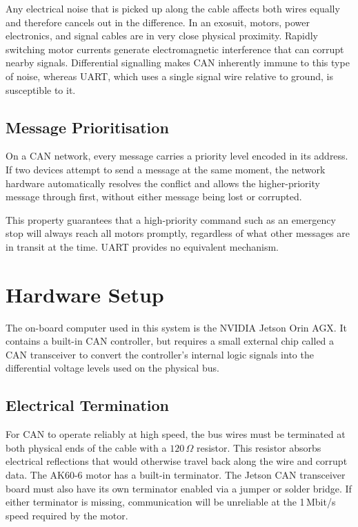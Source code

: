 \documentclass[12pt,a4paper]{article}
\begin{document}
Any electrical noise that is picked up along the cable affects both wires
equally and therefore cancels out in the difference. In an exosuit, motors,
power electronics, and signal cables are in very close physical proximity.
Rapidly switching motor currents generate electromagnetic interference that
can corrupt nearby signals. Differential signalling makes CAN inherently
immune to this type of noise, whereas UART, which uses a single signal wire
relative to ground, is susceptible to it.

\subsection{Message Prioritisation}

On a CAN network, every message carries a priority level encoded in its
address. If two devices attempt to send a message at the same moment, the
network hardware automatically resolves the conflict and allows the
higher-priority message through first, without either message being lost
or corrupted.

This property guarantees that a high-priority command such as an emergency
stop will always reach all motors promptly, regardless of what other
messages are in transit at the time. UART provides no equivalent
mechanism.

\section{Hardware Setup}
\label{sec:hardware}

The on-board computer used in this system is the NVIDIA Jetson Orin AGX.
It contains a built-in CAN controller, but requires a small external chip
called a CAN transceiver to convert the controller's internal logic signals
into the differential voltage levels used on the physical bus.

\subsection{Electrical Termination}

For CAN to operate reliably at high speed, the bus wires must be terminated
at both physical ends of the cable with a $120\,\Omega$ resistor. This
resistor absorbs electrical reflections that would otherwise travel back
along the wire and corrupt data. The AK60-6 motor has a built-in
terminator. The Jetson CAN transceiver board must also have its own
terminator enabled via a jumper or solder bridge. If either terminator
is missing, communication will be unreliable at the 1\,Mbit/s speed
required by the motor.
\end{document}
